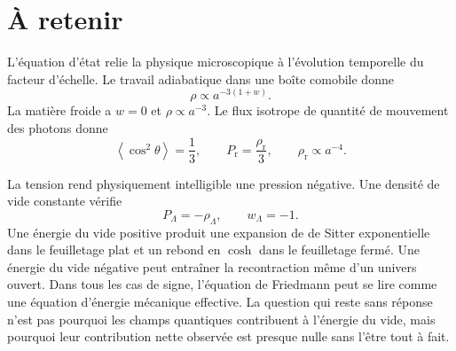 \begin{classroomqa}
\end{classroomqa}

\begin{classroomqa}
\end{classroomqa}

\section{À retenir}

L’équation d’état relie la physique microscopique à l’évolution temporelle du facteur d’échelle. Le travail adiabatique dans une boîte comobile donne
\[
\rho\propto a^{-3(1+w)}.
\]
La matière froide a \(w=0\) et \(\rho\propto a^{-3}\). Le flux isotrope de quantité de mouvement des photons donne
\[
\left\langle\cos^2\theta\right\rangle=\frac13,
\qquad
P_{\mathrm r}=\frac{\rho_{\mathrm r}}{3},
\qquad
\rho_{\mathrm r}\propto a^{-4}.
\]

La tension rend physiquement intelligible une pression négative. Une densité de vide constante vérifie
\[
P_\Lambda=-\rho_\Lambda,
\qquad
w_\Lambda=-1.
\]
Une énergie du vide positive produit une expansion de de Sitter exponentielle dans le feuilletage plat et un rebond en \(\cosh\) dans le feuilletage fermé. Une énergie du vide négative peut entraîner la recontraction même d’un univers ouvert. Dans tous les cas de signe, l’équation de Friedmann peut se lire comme une équation d’énergie mécanique effective. La question qui reste sans réponse n’est pas pourquoi les champs quantiques contribuent à l’énergie du vide, mais pourquoi leur contribution nette observée est presque nulle sans l’être tout à fait.
